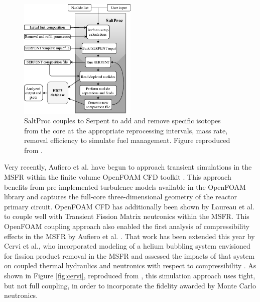 \begin{figure}[htbp]
        \begin{center}
                \includegraphics[width=0.5\textwidth]{saltproc_flowchart.png}
        \end{center}
        \caption{SaltProc couples to Serpent to add and remove specific isotopes from the core
        at the appropriate reprocessing intervals, mass rate, removal 
        efficiency to simulate fuel management. Figure reproduced from 
        \cite{rykhlevskii_modeling_2018,rykhlevskii_online_2017}.}
        \label{fig:saltproc} 
\end{figure}

Very recently, Aufiero et al. \cite{aufiero_development_2014} have begun to
approach transient simulations in the \gls{MSFR} within the finite volume
OpenFOAM \gls{CFD} toolkit \cite{weller_tensorial_1998}.  This approach
benefits from pre-implemented turbulence models available in the OpenFOAM
library and captures the full-core three-dimensional geometry of the reactor
primary circuit.  OpenFOAM \gls{CFD} has additionally been shown by Laureau et
al. \cite{laureau_transient_2017} to couple well with Transient Fission Matrix
neutronics within the \gls{MSFR}. This OpenFOAM coupling approach also enabled the 
first analysis of compressibility effects in the \gls{MSFR} by Aufiero et al. 
\cite{aufiero_monte_2017}. That work has been extended this year by Cervi et 
al., who incorporated modeling of a helium bubbling system envisioned for 
fission product removal in the \gls{MSFR} and assessed the impacts of that 
system on coupled thermal hydraulics and neutronics with respect to 
compressibility \cite{cervi_development_2019}. As shown in Figure 
\ref{fig:cervi}, reproduced from \cite{cervi_development_2019}, this simulation 
approach uses tight, but not full coupling, in order to incorporate the fidelity 
awarded by Monte Carlo neutronics.

